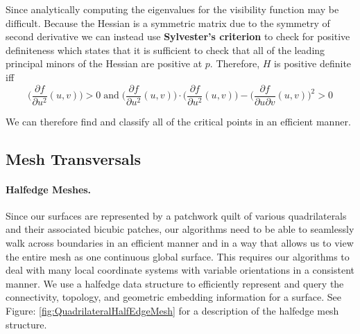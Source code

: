 \documentclass[12pt, letterpaper]{article}
\begin{document}
		Since analytically computing the eigenvalues for the visibility function may be difficult.
		Because the Hessian is a symmetric matrix due to the symmetry of second derivative
		we can instead use \textbf{Sylvester's criterion} to check for positive definiteness which states that it is sufficient to check that all
		of the leading principal minors of the Hessian are positive at $p$. Therefore, $H$ is positive definite iff
		$$\bigg( \frac{\partial f}{\partial u^{2}}(u, v) \bigg) > 0 \; \text{and} \; \bigg(\frac{\partial f}{\partial u^{2}}(u, v) \bigg) \cdot \bigg(\frac{\partial f}{\partial u^{2}}(u, v)\bigg) - \bigg(\frac{\partial f}{\partial u \partial v}(u, v)\bigg)^{2} > 0$$

		We can therefore find and classify all of the critical points in an efficient manner.

	\subsection{Mesh Transversals}
	\label{section:transversals}	

		\paragraph{Halfedge Meshes.}
		Since our surfaces are represented by a patchwork quilt of various quadrilaterals and their associated bicubic patches, our algorithms need to be
		able to seamlessly walk across boundaries in an efficient manner and in a way that allows us to view the entire mesh as one continuous global surface.
		This requires our algorithms to deal with many local coordinate systems with variable orientations in a consistent manner.
		We use a halfedge data structure to efficiently represent and query the connectivity, topology, and geometric embedding information for a surface.
		See Figure: \ref{fig:QuadrilateralHalfEdgeMesh} for a description of the halfedge mesh structure.
\end{document}
